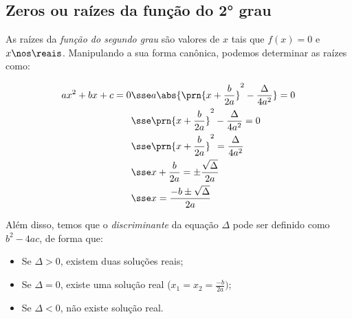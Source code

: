 \subsection{Zeros ou raízes da função do 2° grau}

As raízes da \emph{função do segundo grau} são valores de $x$ tais que $f(x) = 0$ e $x \nos \reais$. Manipulando a sua forma canônica, podemos determinar as raízes como:

\begin{align*}
    ax^2 + bx + c = 0 & \sse a \abs{\prn{x + \frac{b}{2a}}^2 - \frac{\Delta}{4a^2} } = 0 \\
                      & \sse \prn{x + \frac{b}{2a}}^2 - \frac{\Delta}{4a^2} = 0 \\
                      & \sse \prn{x + \frac{b}{2a}}^2 = \frac{\Delta}{4a^2} \\
                      & \sse x + \frac{b}{2a} = \pm \frac{\sqrt{\Delta}}{2a} \\
                      & \sse x = \frac{ - b \pm \sqrt{\Delta}}{2a}
\end{align*}

Além disso, temos que o \emph{discriminante} da equação $\Delta$ pode ser definido como $b^2 - 4ac$, de forma que:

\begin{itemize}
    \item Se $\Delta > 0$, existem duas soluções reais;
	\item Se $\Delta = 0 $, existe uma solução real ($x_1 = x_2 = \frac{-b}{2a})$;
	\item Se $\Delta < 0$, não existe solução real.
\end{itemize}